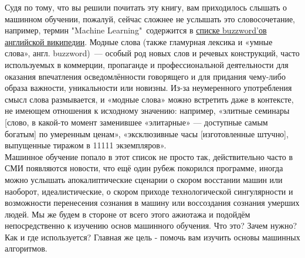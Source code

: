 Судя по тому, что вы решили почитать эту книгу, вам приходилось слышать о машинном обучении, пожалуй, сейчас сложнее не услышать это словосочетание, например, термин "Machine Learning"\ содержится в \href{https://en.wikipedia.org/wiki/List_of_buzzwords}{списке buzzword'ов английской википедии}.
Модные слова (также гламурная лексика и «умные слова», англ. buzzword)~— особый род новых слов и речевых конструкций, часто используемых в коммерции, пропаганде и профессиональной деятельности для оказания впечатления осведомлённости говорящего и для придания чему-либо образа важности, уникальности или новизны. Из-за неумеренного употребления смысл слова размывается, и «модные слова» можно встретить даже в контексте, не имеющем отношения к исходному значению: например, «элитные семинары [слово, в какой-то момент заменившее «элитарные» — доступные самым богатым] по умеренным ценам», «эксклюзивные часы [изготовленные штучно], выпущенные тиражом в 11111 экземпляров». \cite{wiki:buzzword_def}\\

Машинное обучение попало в этот список не просто так, действительно часто в СМИ появляются новости, что ещё один рубеж покорился программе, иногда можно услышать апокалиптические сценарии о скором восстании машин или наоборот, идеалистические, о скором приходе технологической сингулярности и возможности перенесения сознания в машину или воссоздания сознания умерших людей. Мы же будем в стороне от всего этого ажиотажа и подойдём непосредственно к изучению основ машинного обучения. Что это? Зачем нужно? Как и где используется? Главная же цель \-- помочь вам изучить основы машинных алгоритмов.\\

